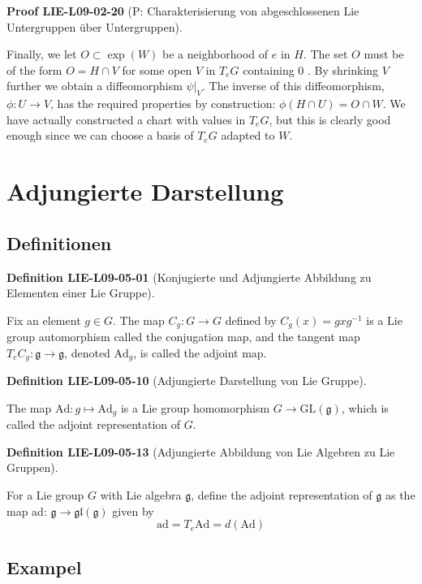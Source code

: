 \documentclass[10pt, letterpaper]{article}
\newcommand{\CustomHeading}[3]{%
  \par\medskip\noindent%
  \textbf{#1 #2} \textnormal{(#3)}.\enskip%
}
\newenvironment{DEF}[2]{\CustomHeading{Definition}{#1}{#2}}{}
\newenvironment{PROOF}[2]{\CustomHeading{Proof}{#1}{#2}}{}
\begin{document}
\begin{PROOF}{LIE-L09-02-20}{P: Charakterisierung von abgeschlossenen Lie Untergruppen über Untergruppen}
Finally, we let $O \subset \exp (W)$ be a neighborhood of $e$ in $H$. The set $O$ must be of the form $O=H \cap V$ for some open $V$ in $T_{e} G$ containing 0 . By shrinking $V$ further we obtain a diffeomorphism $\left.\psi\right|_{V}$. The inverse of this diffeomorphism, $\phi: U \rightarrow V$, has the required properties by construction: $\phi(H \cap U)=O \cap W$. We have actually constructed a chart with values in $T_{e} G$, but this is clearly good enough since we can choose a basis of $T_{e} G$ adapted to $W$.
\end{PROOF}

\section{Adjungierte Darstellung}

\subsection{Definitionen}

\begin{DEF}{LIE-L09-05-01}{Konjugierte und Adjungierte Abbildung zu Elementen einer Lie Gruppe}
Fix an element $g \in G$. The map $C_{g}: G \rightarrow G$ defined by $C_{g}(x)=g x g^{-1}$ is a Lie group automorphism called the conjugation map, and the tangent map $T_{e} C_{g}: \mathfrak{g} \rightarrow \mathfrak{g}$, denoted $\mathrm{Ad}_{g}$, is called the adjoint map.
\end{DEF}

\begin{DEF}{LIE-L09-05-10}{Adjungierte Darstellung von Lie Gruppe}
The map $\mathrm{Ad}: g \mapsto \mathrm{Ad}_{g}$ is a Lie group homomorphism $G \rightarrow \mathrm{GL}(\mathfrak{g})$, which is called the adjoint representation of $G$.
\end{DEF}

\begin{DEF}{LIE-L09-05-13}{Adjungierte Abbildung von Lie Algebren zu Lie Gruppen}
For a Lie group $G$ with Lie algebra $\mathfrak{g}$, define the adjoint representation of $\mathfrak{g}$ as the map ad: $\mathfrak{g} \rightarrow \mathfrak{g} \mathfrak{l}(\mathfrak{g})$ given by
$$
\mathrm{ad}=T_{e} \mathrm{Ad}=d(\mathrm{Ad})
$$
\end{DEF}

\subsection{Exampel}
\end{document}
